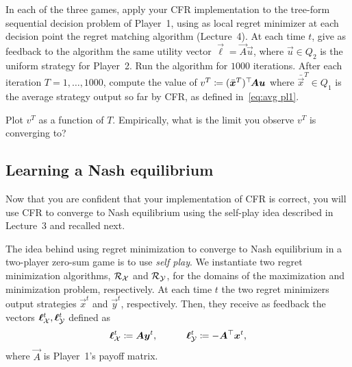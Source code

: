 \documentclass{homework}
\begin{document}
\begin{problem}[25 points]
    In each of the three games, apply your CFR implementation to the tree-form sequential decision problem of Player~1, using as local regret minimizer at each decision point the regret matching algorithm (Lecture~4). At each time $t$, give as feedback to the algorithm the same utility vector $\vec{\ell} = \vec{A}\vec{u}$, where $\vec{u}\in Q_2$ is the uniform strategy for Player~2. Run the algorithm for $1000$ iterations. After each iteration $T = 1,\dots,1000$, compute the value of $v^T \coloneqq (\bar{\bm{x}}^T)^\top\!\bm{A}\bm{u}$ where $\bar{\vec{x}}^T\in Q_1$ is the average strategy output so far by CFR, as defined in~\eqref{eq:avg pl1}. 
    
    Plot $v^T$ as a function of $T$. Empirically, what is the limit you observe $v^T$ is converging to?
\end{problem}
\begin{solution}
\end{solution}

\subsection{Learning a Nash equilibrium}

Now that you are confident that your implementation of CFR is correct, you will use CFR to converge to Nash equilibrium using the self-play idea described in Lecture~3 and recalled next.

The idea behind using regret minimization to converge to Nash equilibrium in a two-player zero-sum game is to use \emph{self play}. We instantiate two regret minimization algorithms, $\mathcal{R}_{\mathcal{X}}$ and $\mathcal{R}_{\mathcal{Y}}$, for the domains of the maximization and minimization problem, respectively. At each time $t$ the two regret minimizers output strategies $\vec{x}^t$ and $\vec{y}^t$, respectively. Then, they receive as feedback the vectors $\bm{\ell}_{\mathcal{X}}^t, \bm{\ell}_{\mathcal{Y}}^t$ defined as
\begin{equation}\label{eq:utilities self play}
      \bm{\ell}^t_{\mathcal{X}} \coloneqq \bm{A}\bm{y}^t,\qquad\quad
      \bm{\ell}^t_{\mathcal{Y}} \coloneqq -\bm{A}^\top \bm{x}^t,
\end{equation}
where $\vec{A}$ is Player~1's payoff matrix.
\end{document}
